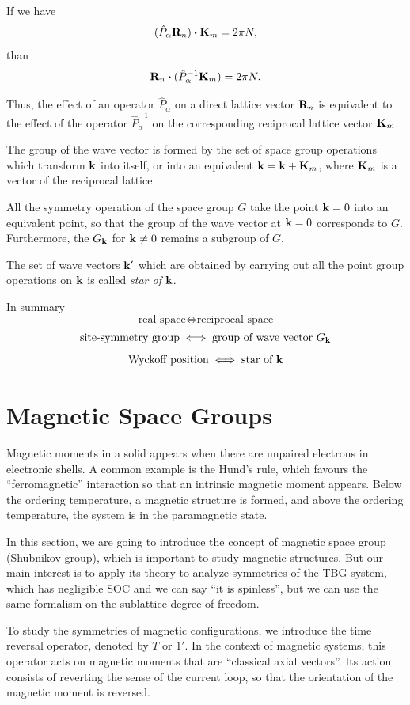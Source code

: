If we have
$$
(\hat{P}_\alpha \R_n) \vdot \K_m = 2 \pi N,
$$
than
$$
\R_n \vdot (\hat{P}_\alpha^{-1} \K_m) = 2 \pi N.
$$

Thus, the effect of an operator $\hat{P}_\alpha$ on a direct lattice vector ${\vb{R}}_n$ is equivalent to the effect of the operator $\hat{P}_\alpha^{-1}$ on the corresponding reciprocal lattice vector ${\vb{K}}_m$.

\n

The group of the wave vector is formed by the set of space group operations which transform ${\vb{k}}$ into itself, or into an equivalent ${\vb{k}} = {\vb{k}} + {\vb{K}}_m$, where ${\vb{K}}_m$ is a vector of the reciprocal lattice.

All the symmetry operation of the space group $G$ take the point ${\vb{k}} = 0$ into an equivalent point, so that the group of the wave vector at ${\vb{k}} = 0$ corresponds to $G$. Furthermore, the $G_{\vb{k}}$ for ${\vb{k}} \neq 0$ remains a subgroup of $G$.

\n

The set of wave vectors ${\vb{k}}'$ which are obtained by carrying out all the point group operations on ${\vb{k}}$ is called \textit{star of} ${\vb{k}}$.

\n

In summary
$$
\text{real space} \iff \text{reciprocal space}
$$
$$
\text{site-symmetry group} \iff \text{group of wave vector }G_{\vb{k}}
$$
$$
\text{Wyckoff position} \iff \text{star of }{\vb{k}}
$$

\section{Magnetic Space Groups}

Magnetic moments in a solid appears when there are unpaired electrons in electronic shells. A common example is the Hund's rule, which favours the ``ferromagnetic'' interaction so that an intrinsic magnetic moment appears. Below the ordering temperature, a magnetic structure is formed, and above the ordering temperature, the system is in the paramagnetic state.

In this section, we are going to introduce the concept of magnetic space group (Shubnikov group), which is important to study magnetic structures. But our main interest is to apply its theory to analyze symmetries of the TBG system, which has negligible SOC and we can say ``it is spinless'', but we can use the same formalism on the sublattice degree of freedom.

To study the symmetries of magnetic configurations, we introduce the time reversal operator, denoted by $T$ or $1'$. In the context of magnetic systems, this operator acts on magnetic moments that are ``classical axial vectors''. Its action consists of reverting the sense of the current loop, so that the orientation of the magnetic moment is reversed.

